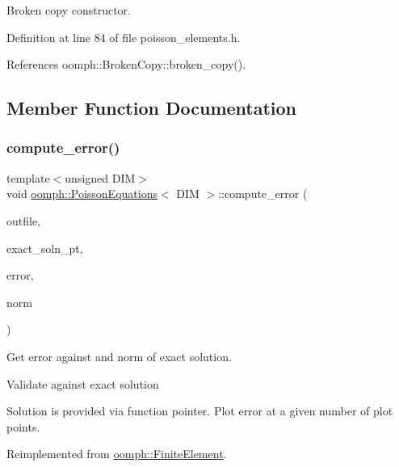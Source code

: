 Broken copy constructor. 



Definition at line 84 of file poisson\+\_\+elements.\+h.



References oomph\+::\+Broken\+Copy\+::broken\+\_\+copy().



\subsection{Member Function Documentation}
\mbox{\label{classoomph_1_1PoissonEquations_aa80d68fe086a9adba93ac67afa1bb2f7}} 
\subsubsection{\texorpdfstring{compute\+\_\+error()}{compute\_error()}\hspace{0.1cm}{\footnotesize\ttfamily [1/2]}}
{\footnotesize\ttfamily template$<$unsigned D\+IM$>$ \\
void \hyperlink{classoomph_1_1PoissonEquations}{oomph\+::\+Poisson\+Equations}$<$ D\+IM $>$\+::compute\+\_\+error (\begin{DoxyParamCaption}\item[{std\+::ostream \&}]{outfile,  }\item[{\hyperlink{classoomph_1_1FiniteElement_a690fd33af26cc3e84f39bba6d5a85202}{Finite\+Element\+::\+Steady\+Exact\+Solution\+Fct\+Pt}}]{exact\+\_\+soln\+\_\+pt,  }\item[{double \&}]{error,  }\item[{double \&}]{norm }\end{DoxyParamCaption})\hspace{0.3cm}{\ttfamily [virtual]}}



Get error against and norm of exact solution. 

Validate against exact solution

Solution is provided via function pointer. Plot error at a given number of plot points. 

Reimplemented from \hyperlink{classoomph_1_1FiniteElement_a73c79a1f1e5b1d334757812a6bbd58ff}{oomph\+::\+Finite\+Element}.



